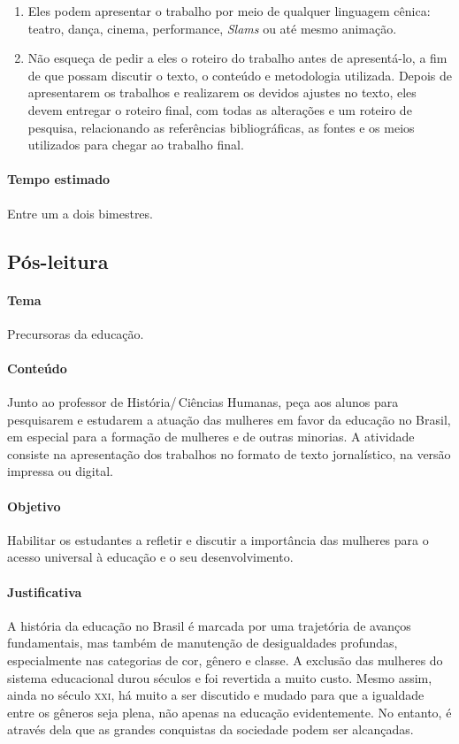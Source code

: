 \documentclass[12pt]{extarticle}
\begin{document}
\begin{enumerate}
\item
Eles podem apresentar o trabalho por meio de qualquer linguagem
cênica: teatro, dança, cinema, performance, \emph{Slams} ou até mesmo
animação.

\item
Não esqueça de pedir a eles o roteiro do trabalho antes de
apresentá-lo, a fim de que possam discutir o texto, o conteúdo e
metodologia utilizada. Depois de apresentarem os trabalhos e realizarem
os devidos ajustes no texto, eles devem entregar o roteiro final, com
todas as alterações e um roteiro de pesquisa, relacionando as
referências bibliográficas, as fontes e os meios utilizados para chegar
ao trabalho final.
\end{enumerate}

\paragraph{Tempo estimado} Entre um a dois bimestres.


\subsection{Pós-leitura}

\paragraph{Tema} Precursoras da educação.

\paragraph{Conteúdo} Junto ao professor de História/\,Ciências Humanas, 
peça aos alunos para pesquisarem e estudarem a atuação das mulheres em favor da
educação no Brasil, em especial para a formação de mulheres e de outras
minorias. A atividade consiste na apresentação dos trabalhos no formato
de texto jornalístico, na versão impressa ou digital.

\paragraph{Objetivo} Habilitar os estudantes a refletir e discutir a
importância das mulheres para o acesso universal à educação e o seu
desenvolvimento.

\paragraph{Justificativa} A história da educação no Brasil é marcada por
uma trajetória de avanços fundamentais, mas também de manutenção de
desigualdades profundas, especialmente nas categorias de cor, gênero e
classe. A exclusão das mulheres do sistema educacional durou séculos e
foi revertida a muito custo. Mesmo assim, ainda no século \textsc{xxi}, há muito
a ser discutido e mudado para que a igualdade entre os gêneros seja
plena, não apenas na educação evidentemente. No entanto, é através dela
que as grandes conquistas da sociedade podem ser alcançadas.
\end{document}

